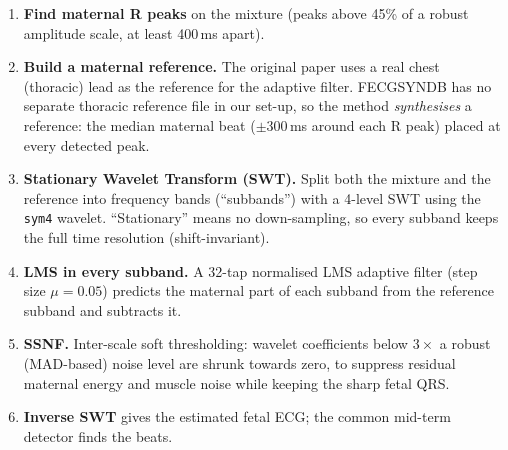 \documentclass[11pt]{article}
\begin{document}
\begin{simple}
\begin{enumerate}
  \item \textbf{Find maternal R peaks} on the mixture (peaks above 45\% of a robust amplitude scale, at least 400\,ms apart).
  \item \textbf{Build a maternal reference.} The original paper uses a real chest (thoracic) lead as the reference for the adaptive filter. FECGSYNDB has no separate thoracic reference file in our set-up, so the method \emph{synthesises} a reference: the median maternal beat ($\pm 300$\,ms around each R peak) placed at every detected peak.
  \item \textbf{Stationary Wavelet Transform (SWT).} Split both the mixture and the reference into frequency bands (``subbands'') with a 4-level SWT using the \texttt{sym4} wavelet. ``Stationary'' means no down-sampling, so every subband keeps the full time resolution (shift-invariant).
  \item \textbf{LMS in every subband.} A 32-tap normalised LMS adaptive filter (step size $\mu = 0.05$) predicts the maternal part of each subband from the reference subband and subtracts it.
  \item \textbf{SSNF.} Inter-scale soft thresholding: wavelet coefficients below $3\times$ a robust (MAD-based) noise level are shrunk towards zero, to suppress residual maternal energy and muscle noise while keeping the sharp fetal QRS.
  \item \textbf{Inverse SWT} gives the estimated fetal ECG; the common mid-term detector finds the beats.
\end{enumerate}
\end{simple}

\begin{tried}
\end{tried}
\end{document}
